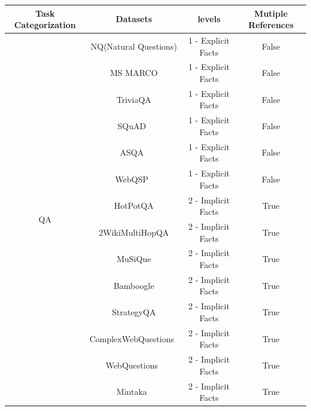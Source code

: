 \begin{table}[]
\centering
\begin{tabular}{cccc}
\hline
Task   Categorization & \rule{0pt}{1.2em} Datasets   \vspace{0.2em}                              & levels             & Mutiple References \\ \hline
\multirow{17}{*}{QA} & \rule{0pt}{1em} NQ(Natural Questions)\cite{kwiatkowski2019natural}     & 1 - Explicit Facts & False \\
                      & \rule{0pt}{1em}MS MARCO \cite{bajaj2016ms}              & 1 - Explicit Facts & False              \\
                      & \rule{0pt}{1em}TriviaQA\cite{2017arXivtriviaqa}         & 1 - Explicit Facts & False              \\
                      & \rule{0pt}{1em}SQuAD~\cite{rajpurkar2016squad}          & 1 - Explicit Facts & False              \\
                      & \rule{0pt}{1em}ASQA~\cite{stelmakh2022asqa}             & 1 - Explicit Facts & False              \\
                      & \rule{0pt}{1em}WebQSP~\cite{webqsp_dataset}             & 1 - Explicit Facts & False              \\
                      & \rule{0pt}{1em}HotPotQA\cite{yang2018hotpotqa}          & 2 - Implicit Facts & True               \\
                      & \rule{0pt}{1em}2WikiMultiHopQA\cite{ho2020constructing} & 2 - Implicit Facts & True               \\
                      & \rule{0pt}{1em}MuSiQue\cite{trivedi2022musique}         & 2 - Implicit Facts & True               \\
                      & \rule{0pt}{1em}Bamboogle\cite{press2022measuring}       & 2 - Implicit Facts & True               \\
                      & \rule{0pt}{1em}StrategyQA\cite{geva2021did}             & 2 - Implicit Facts & True               \\
                      & \rule{0pt}{1em}ComplexWebQuestions~\cite{ComplexWebQuestions_dataset} & 2 - Implicit Facts & True  \\
                      & \rule{0pt}{1em}WebQuestions~\cite{webquestion_dataset}  & 2 - Implicit Facts & True               \\
                      & \rule{0pt}{1em}Mintaka~\cite{sen2022mintaka}            & 2 - Implicit Facts & True               \\

\end{tabular}
\end{table}
